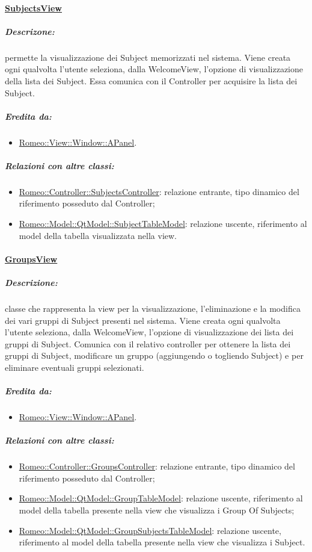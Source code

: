 	\paragraph{\underline{SubjectsView}}
	\label{vsv} 
		\subparagraph{Descrizone:} permette la visualizzazione dei Subject\glossario{} memorizzati nel sistema. Viene creata ogni qualvolta l'utente seleziona, dalla WelcomeView, l'opzione di visualizzazione della lista dei Subject\glossario{}. Essa comunica con il Controller per acquisire la lista dei Subject\glossario{}.
		\subparagraph{Eredita da:}
			\begin{itemize}
				\item \hyperref[ab_panel]{Romeo::View::Window::APanel}.
			\end{itemize}	
		\subparagraph{Relazioni con altre classi:}
			\begin{itemize}
				\item \hyperref[controller_ss]{Romeo::Controller::SubjectsController}: relazione entrante, tipo dinamico del riferimento posseduto dal Controller;
				\item \hyperref[controller_tm]{Romeo::Model::QtModel::SubjectTableModel}: relazione uscente, riferimento al model della tabella visualizzata nella view.
			\end{itemize}
		
	\paragraph{\underline{GroupsView}}
	\label{vgv} 
		\subparagraph{Descrizione:}
		classe che rappresenta la view per la visualizzazione, l'eliminazione e la modifica dei vari gruppi di Subject\glossario{} presenti nel sistema. Viene creata ogni qualvolta l'utente seleziona, dalla WelcomeView, l'opzione di visualizzazione dei lista dei gruppi di Subject\glossario{}. Comunica con il relativo controller per ottenere la lista dei gruppi di Subject\glossario{}, modificare un gruppo (aggiungendo o togliendo Subject\g{}) e per eliminare eventuali gruppi selezionati.
		\subparagraph{Eredita da:} 
			\begin{itemize}
				\item \hyperref[ab_panel]{Romeo::View::Window::APanel}.
			\end{itemize}
		\subparagraph{Relazioni con altre classi:}
			\begin{itemize}
				\item \hyperref[controller_sg]{Romeo::Controller::GroupsController}: relazione entrante, tipo dinamico del riferimento posseduto dal Controller;
				\item \hyperref[controller_tm]{Romeo::Model::QtModel::GroupTableModel}: relazione uscente, riferimento al model della tabella presente nella view che visualizza i Group Of Subjects;
				\item \hyperref[controller_tm]{Romeo::Model::QtModel::GroupSubjectsTableModel}: relazione uscente, riferimento al model della tabella presente nella view che visualizza i Subject.
			\end{itemize}

